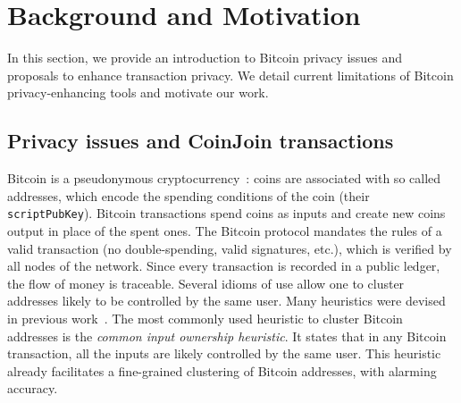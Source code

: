 \documentclass[a4paper]{article}
\begin{document}
\section{Background and Motivation} \label{sec:background}

In this section, we provide an introduction to Bitcoin privacy issues and proposals to enhance transaction privacy. We detail current limitations of Bitcoin privacy-enhancing tools and motivate our work.

\subsection{Privacy issues and CoinJoin transactions}

Bitcoin is a pseudonymous cryptocurrency~\cite{nakamoto2009bitcoin}: coins are associated with so called addresses, which encode the spending conditions of the coin (their \texttt{scriptPubKey}). Bitcoin transactions spend coins as inputs and create new coins output in place of the spent ones. The Bitcoin protocol mandates the rules of a valid transaction (no double-spending, valid signatures, etc.), which is verified by all nodes of the network. Since every transaction is recorded in a public ledger, the flow of money is traceable. Several idioms of use allow one to cluster addresses likely to be controlled by the same user. Many heuristics were devised in previous work~\cite{meiklejohn2013fistful,androulaki2013evaluating,reid2013analysis,ron2013quantitative}. The most commonly used heuristic to cluster Bitcoin addresses is the \emph{common input ownership heuristic}. It states that in any Bitcoin transaction, all the inputs are likely controlled by the same user. This heuristic already facilitates a fine-grained clustering of Bitcoin addresses, with alarming accuracy\cite{nick2015data}.
\end{document}

